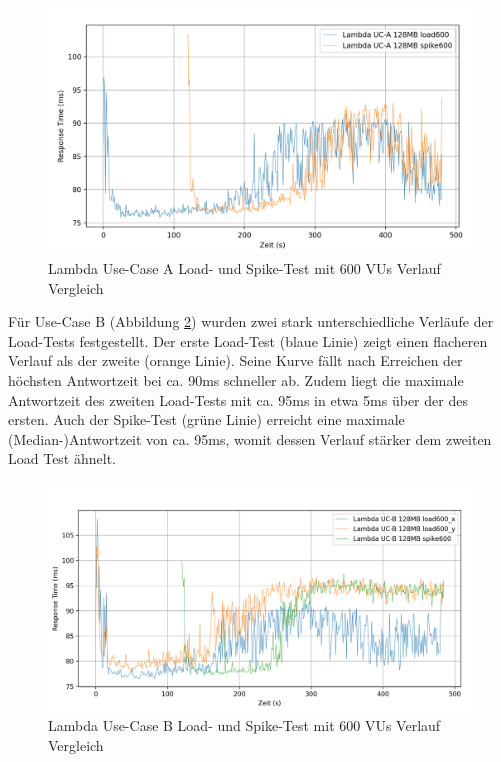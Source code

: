\begin{figure}[H]
    \includegraphics[width=\textwidth]{img/lambda-uca-load600-vs-spike600-example-new.png}
    \caption[Lambda Use-Case A Load- und Spike-Test mit 600 VUs Verlauf Vergleich]{Lambda Use-Case A Load- und Spike-Test mit 600 VUs Verlauf Vergleich}
    \label{fig:lambda-uca-load600-vs-spike600-example}
\end{figure}

Für Use-Case B (Abbildung \ref{fig:lambda-ucb-load600-vs-spike600-example}) wurden zwei stark unterschiedliche Verläufe der Load-Tests festgestellt. Der erste Load-Test (blaue Linie) zeigt einen flacheren Verlauf als der zweite (orange Linie). Seine Kurve fällt nach Erreichen der höchsten Antwortzeit bei ca. 90ms schneller ab. Zudem liegt die maximale Antwortzeit des zweiten Load-Tests mit ca. 95ms in etwa 5ms über der des ersten. Auch der Spike-Test (grüne Linie) erreicht eine maximale (Median-)Antwortzeit von ca. 95ms, womit dessen Verlauf stärker dem zweiten Load Test ähnelt. 

\begin{figure}[H]
    \includegraphics[width=\textwidth]{img/lambda-ucb-load600-vs-spike600-example2.png}
    \caption[Lambda Use-Case B Load- und Spike-Test mit 600 VUs Verlauf Vergleich]{Lambda Use-Case B Load- und Spike-Test mit 600 VUs Verlauf Vergleich}
    \label{fig:lambda-ucb-load600-vs-spike600-example}
\end{figure}

